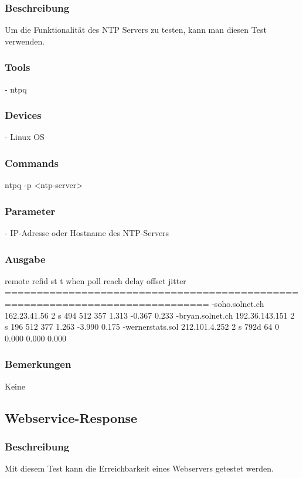 \documentclass[a4,12pt]{scrartcl}
\begin{document}
\subsubsection{Beschreibung}
Um die Funktionalität des NTP Servers zu testen, kann man diesen Test verwenden.
\subsubsection{Tools}
- ntpq
\subsubsection{Devices}
- Linux OS
\subsubsection{Commands}
ntpq -p <ntp-server>
\subsubsection{Parameter}
- IP-Adresse oder Hostname des NTP-Servers
\subsubsection{Ausgabe}
     remote           refid      st t when poll reach   delay   offset  jitter\newline
==============================================================================\newline
-soho.solnet.ch  162.23.41.56     2 s  494  512  357    1.313   -0.367   0.233\newline
-bryan.solnet.ch 192.36.143.151   2 s  196  512  377    1.263   -3.990   0.175\newline
-wernerstats.sol 212.101.4.252    2 s 792d   64    0    0.000    0.000   0.000\newline
\subsubsection{Bemerkungen}
Keine


\subsection{Webservice-Response}
\subsubsection{Beschreibung}
Mit diesem Test kann die Erreichbarkeit eines Webservers getestet werden.
\end{document}

